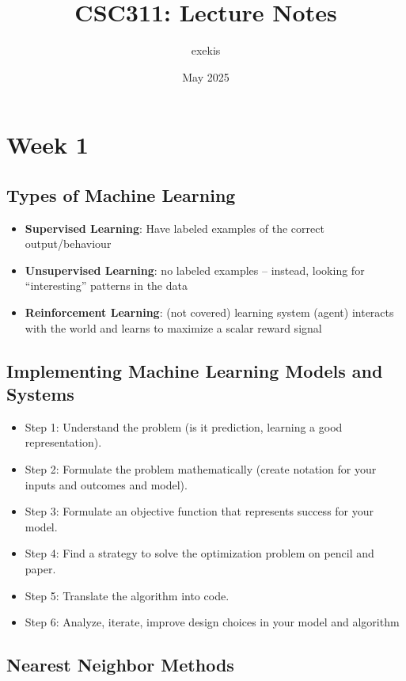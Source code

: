 \documentclass{article}
\title{CSC311: Lecture Notes}
\author{exekis}
\date{May 2025}
\begin{document}
\maketitle

\section*{Week 1}

\subsection*{Types of Machine Learning}
\begin{itemize}
    \item \textbf{Supervised Learning}: Have labeled examples of the correct output/behaviour
    \item \textbf{Unsupervised Learning}: no labeled examples – instead, looking
    for “interesting” patterns in the data
    \item \textbf{Reinforcement Learning}: (not covered) learning system (agent)
      interacts with the world and learns to maximize a scalar reward
      signal
\end{itemize}

\subsection*{Implementing Machine Learning Models and Systems}
\begin{itemize}
    \item Step 1: Understand the problem (is it prediction, learning a good representation).
    \item Step 2: Formulate the problem mathematically (create notation for your inputs and outcomes and model).
    \item Step 3: Formulate an objective function that represents success for your model.
    \item Step 4: Find a strategy to solve the optimization problem on pencil and paper.
    \item Step 5: Translate the algorithm into code.
    \item Step 6: Analyze, iterate, improve design choices in your model and algorithm
\end{itemize}

\subsection*{Nearest Neighbor Methods}
\end{document}
